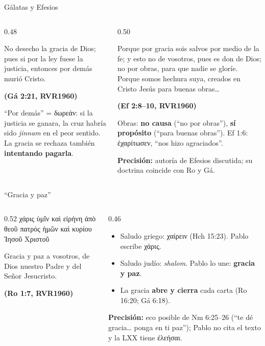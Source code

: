 \documentclass[hyperref={bookmarks=false},aspectratio=169]{beamer}
\newcommand{\grc}[1]{\foreignlanguage{ancientgreek}{#1}}
\newcommand{\fuente}[1]{\par\hfill{\upshape\bfseries\footnotesize\textcolor{azul}{#1}}}
\newcommand{\destacar}[1]{\textbf{\textcolor{azul}{#1}}}
\newcommand{\precision}[1]{{\footnotesize\color{gris}\textbf{Precisión:} #1}}
\begin{document}
\begin{frame}{Gálatas y Efesios}
\begin{columns}[t,onlytextwidth]
\begin{column}{0.48\textwidth}
\begin{cita}No desecho la gracia de Dios; pues si por la ley fuese la justicia, entonces por demás murió Cristo.\fuente{(Gá 2:21, RVR1960)}\end{cita}
\scriptsize ``Por demás'' = \grc{δωρεάν}: si la justicia se ganara, la cruz habría sido \emph{jinnam} en el peor sentido. La gracia se rechaza también \destacar{intentando pagarla}.
\end{column}
\begin{column}{0.50\textwidth}
\begin{cita}Porque por gracia sois salvos por medio de la fe; y esto no de vosotros, pues es don de Dios; no por obras, para que nadie se gloríe. Porque somos hechura suya, creados en Cristo Jesús para buenas obras\ldots\fuente{(Ef 2:8--10, RVR1960)}\end{cita}
\scriptsize Obras: \destacar{no causa} (``no por obras''), \destacar{sí propósito} (``para buenas obras''). Ef 1:6: \grc{ἐχαρίτωσεν}, ``nos hizo agraciados''.\par
\precision{autoría de Efesios discutida; su doctrina coincide con Ro y Gá.}
\end{column}
\end{columns}
\end{frame}

\begin{frame}{``Gracia y paz''}
\begin{columns}[c,onlytextwidth]
\begin{column}{0.52\textwidth}
\centering\grc{χάρις ὑμῖν καὶ εἰρήνη ἀπὸ θεοῦ πατρὸς ἡμῶν καὶ κυρίου Ἰησοῦ Χριστοῦ}
\begin{cita}Gracia y paz a vosotros, de Dios nuestro Padre y del Señor Jesucristo.\fuente{(Ro 1:7, RVR1960)}\end{cita}
\end{column}
\begin{column}{0.46\textwidth}\small\RaggedRight
\begin{itemize}
\item Saludo griego: \grc{χαίρειν} (Hch 15:23). Pablo escribe \grc{χάρις}.
\item Saludo judío: \emph{shalom}. Pablo lo une: \destacar{gracia y paz}.
\item La gracia \destacar{abre y cierra} cada carta (Ro 16:20; Gá 6:18).
\end{itemize}
\precision{eco posible de Nm 6:25--26 (``te dé gracia\ldots{} ponga en ti paz''); Pablo no cita el texto y la LXX tiene \grc{ἐλεήσαι}.}
\end{column}
\end{columns}
\end{frame}
\end{document}
